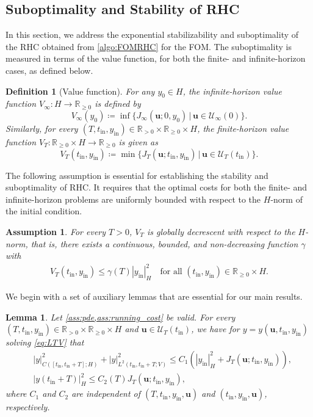 \documentclass{m2an}
\def\R{\mathbb{R}}
\newcommand{\bu}{\mathbf{u}}
\newcommand{\tint}{t_{\mathrm{in}}}
\newcommand{\yint}{y_{\mathrm{in}}}
\newcommand{\mU}{{\mathscr U}}
\newcommand{\norm}[2]{\left|#1\right|_{#2}}
\newtheorem{lemma}[thrm]{Lemma}
\newtheorem{assumption}[thrm]{Assumption}
\newtheorem{definition}[thrm]{Definition}
\begin{document}
\subsection{Suboptimality and Stability of RHC}
In this section, we address the exponential stabilizability and suboptimality of the RHC obtained from \cref{algo:FOMRHC} for {the} FOM. The suboptimality is measured in terms of the value function, for both the finite- and infinite-horizon cases, as defined below.
%
\begin{definition}[Value function]
%
For any $y_0 \in H$, the \emph{infinite-horizon value function} $V_{\infty}: H \to \R_{\geq 0}$ is defined by
%
\begin{equation*}
    V_{\infty}(y_0)\coloneqq \inf \big\{J_{\infty}(\bu;0,y_0)\,\big|\,\bu\in \mU_\infty(0)\big\}.
\end{equation*}
%
Similarly, for every $(T,\tint,\yint)\in{\R_{>0}\times\R_{\ge0}} \times H$, the \emph{finite-horizon value function} $V_{T}:\R_{\ge0} \times H \to \R_{\ge0}$ is given as
%
\begin{equation*}
    V_{T}(\tint,\yint)\coloneqq  \min \big\{J_{T}(\bu;\tint,\yint)\,\big|\,\bu\in \mU_T(\tint)\big\}.
\end{equation*}
%
\end{definition}
%
The following assumption is essential for establishing the stability and suboptimality of RHC. It requires that the optimal costs for both the finite- and infinite-horizon problems are uniformly bounded with respect to the $H$-norm of the initial condition.
%
\begin{assumption}\label{ass:1}
%
For every $T>0$, $V_T$ is \emph{globally decrescent} with respect to the $H$-norm, that is, there exists a continuous, bounded, and non-decreasing function $\gamma$ with
        \begin{align}\label{e7}
            V_T(\tint,\yint)\leq \gamma(T)\norm{\yint}{H}^2\quad\text{for all }(\tint,\yint)\in\R_{\ge0}\times H.
        \end{align}
\end{assumption}
%
We begin with a set of auxiliary lemmas that are essential for our main results.
%
\begin{lemma}\label{ass:2}
    Let \cref{ass:pde,ass:running_cost} be valid. For every $(T,\tint ,\yint) \in \R_{>0}\times \R_{\geq 0} \times  H$ and $\bu \in \mU_T(\tint)$, we have for $y=y(\bu,\tint,\yint)$ solving \eqref{eq:LTV} that
    \begin{align}
        &\norm{y}{C([\tint,\tint+T];H)}^2+\norm{y}{L^2(\tint,\tint+T;V)}^2  \leq C_1 \left(  \norm{\yint}{H}^2 +  J_{T}(\bu; \tint, \yint)  \right)\label{e8},\\
        &\norm{y(\tint+T)}{H}^2 \leq C_2(T) J_{T}(\bu; \tint, \yint)\label{e8a},
    \end{align}
    where $C_1$ and  $C_2$  are independent of $(T, \tint, \yint, \bu)$ and $( \tint,\yint, \bu)$, respectively.
\end{lemma}
\end{document}
